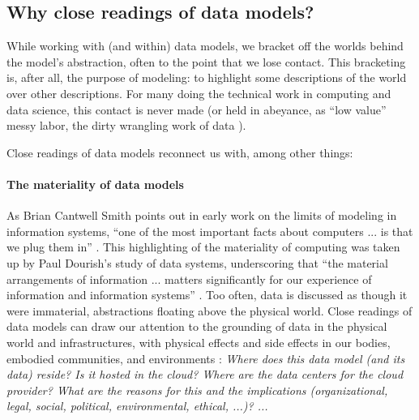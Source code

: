\subsection{Why close readings of data models?}
While working with (and within) data models, we bracket off the worlds behind the model's abstraction, often to the point that we lose contact. This bracketing is, after all, the purpose of modeling: to highlight some descriptions of the world over other descriptions.  For many doing the technical work in computing and data science, this contact is never made (or held in abeyance, as ``low value'' messy labor, the dirty wrangling work of data  \cite{SambasivanKHAPA21}).  

Close readings of data models reconnect us with, among other things:

\paragraph{The materiality of data models}  
As Brian Cantwell Smith points out in early work on the limits of modeling in information systems,   ``one of the most important facts about computers ... is that we plug them in'' \cite{Smith85}.  This highlighting of the materiality of computing was taken up by Paul Dourish's study of data systems,  underscoring that ``the material arrangements of information ... matters significantly for our experience of information and information systems'' \cite{dourish}.  Too often, data is discussed as though it were immaterial, abstractions floating above the physical world. Close readings of data models can draw our attention to the grounding of data in the physical world and infrastructures, with physical effects and side effects in our bodies, embodied communities, and environments \cite{hogan}:
{\em  Where does this data model (and its data) reside?  Is it hosted in the cloud?  Where are the data centers for the cloud provider?  What are the reasons for this and the implications (organizational, legal, social, political, environmental, ethical, ...)? ...}


